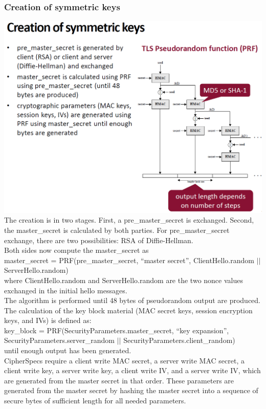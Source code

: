 \documentclass[12pt]{article}
\begin{document}
 \subsubsection{Creation of symmetric keys}
 \includegraphics[width=\linewidth]{./slides/L7P2SYMK.PNG}\\
 The creation is in two stages. First, a pre\_master\_secret is exchanged. Second, the master\_secret is calculated by both parties. For pre\_master\_secret exchange, there are two possibilities: RSA of Diffie-Hellman.\\
 Both sides now compute the master\_secret as\\
 master\_secret = PRF(pre\_master\_secret, “master secret”, ClientHello.random $||$ ServerHello.random)\\
 where ClientHello.random and ServerHello.random are the two nonce values exchanged in the initial hello messages.\\
 The algorithm is performed until 48 bytes of pseudorandom output are produced. The calculation of the key block material (MAC secret keys, session encryption keys, and IVs) is defined as:\\
 key\_block = PRF(SecurityParameters.master\_secret, “key expansion”, SecurityParameters.server\_random $||$ SecurityParameters.client\_random)\\
 until enough output has been generated.\\
 CipherSpecs require a client write MAC secret, a server write MAC secret, a client write key, a server write key, a client write IV, and a server write IV, which are generated from the master secret in that order. These parameters are generated from the master secret by hashing the master secret into a sequence of secure bytes of sufficient length for all needed parameters.\\
\end{document}
